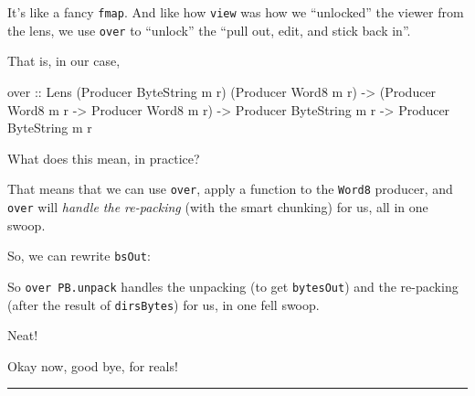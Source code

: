\documentclass[]{article}
\newenvironment{Shaded}{}{}
\newcommand{\DataTypeTok}[1]{\textcolor[rgb]{0.56,0.13,0.00}{#1}}
\newcommand{\FunctionTok}[1]{\textcolor[rgb]{0.02,0.16,0.49}{#1}}
\newcommand{\NormalTok}[1]{#1}
\newcommand{\OperatorTok}[1]{\textcolor[rgb]{0.40,0.40,0.40}{#1}}
\newcommand{\OtherTok}[1]{\textcolor[rgb]{0.00,0.44,0.13}{#1}}
\begin{document}
It's like a fancy \texttt{fmap}. And like how \texttt{view} was how we
``unlocked'' the viewer from the lens, we use \texttt{over} to ``unlock'' the
``pull out, edit, and stick back in''.

That is, in our case,

\begin{Shaded}
\begin{Highlighting}[]
\OtherTok{over ::} \DataTypeTok{Lens\textquotesingle{}}\NormalTok{ (}\DataTypeTok{Producer} \DataTypeTok{ByteString}\NormalTok{ m r) (}\DataTypeTok{Producer} \DataTypeTok{Word8}\NormalTok{ m r)}
     \OtherTok{{-}>}\NormalTok{ (}\DataTypeTok{Producer} \DataTypeTok{Word8}\NormalTok{ m r }\OtherTok{{-}>} \DataTypeTok{Producer} \DataTypeTok{Word8}\NormalTok{ m r)}
     \OtherTok{{-}>} \DataTypeTok{Producer} \DataTypeTok{ByteString}\NormalTok{ m r}
     \OtherTok{{-}>} \DataTypeTok{Producer} \DataTypeTok{ByteString}\NormalTok{ m r}
\end{Highlighting}
\end{Shaded}

What does this mean, in practice?

That means that we can use \texttt{over}, apply a function to the \texttt{Word8}
producer, and \texttt{over} will \emph{handle the re-packing} (with the smart
chunking) for us, all in one swoop.

So, we can rewrite \texttt{bsOut}:

\begin{Shaded}
\end{Shaded}

So \texttt{over\ PB.unpack} handles the unpacking (to get \texttt{bytesOut}) and
the re-packing (after the result of \texttt{dirsBytes}) for us, in one fell
swoop.

Neat!

Okay now, good bye, for reals!

\begin{center}\rule{0.5\linewidth}{\linethickness}\end{center}
\end{document}
